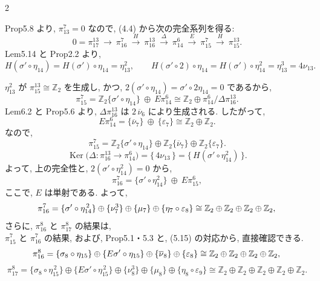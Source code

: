 \documentclass[10pt, leqno]{ltjsarticle}
\newcommand{\ov}[1]{\overline{#1}}
\newcommand{\gen}[1]{\{#1\}}       %
\newcommand{\Ker}{\operatorname{Ker}}
\newcommand{\pit}[2]{\pi_{#1}^{#2}}
\numberwithin{equation}{section}
\theoremstyle{plain}
\theoremstyle{definition}
\theoremstyle{remark}
\begin{document}
\begin{paracol}{2}

Prop5.8 より, \(\pit{13}{7}=0\) なので,  (4.4) から次の完全系列を得る:
\[
0=\pit{17}{13}\ \xrightarrow{}\ \pit{16}{7}\ \xrightarrow{\ H\ }\ \pit{16}{13}
\ \xrightarrow{\ \Delta\ }\ \pit{14}{6}\ \xrightarrow{\ E\ }\ \pit{15}{7}
\ \xrightarrow{\ H\ }\ \pit{15}{13}.
\]
Lem5.14 と Prop2.2 より,
\[
H(\sigma'\circ \eta_{14})=H(\sigma')\circ \eta_{14}=\eta_{13}^{2},
\qquad
H(\sigma'\circ 2)\circ \eta_{14}=H(\sigma')\circ \eta_{14}^{2}=\eta_{13}^{3}=4\nu_{13}.
\]


\noindent
\(\eta_{13}^{2}\) が \(\pit{15}{13}\cong\mathbb Z_{2}\) を生成し, かつ,
\(2(\sigma'\circ\eta_{14})=\sigma'\circ 2\eta_{14}=0\) であるから, 
\[
\pit{15}{7}
=\mathbb{Z}_2\gen{\sigma'\circ\eta_{14}}\ \oplus\ E\pit{14}{6}
\cong \mathbb{Z}_2\oplus\pit{14}{6}/\Delta\pit{16}{13}.
\]
Lem6.2 と Prop5.6 より, 
\(\Delta\pit{16}{13}\) は \(2\,\ov{\nu}_{6}\) により生成される. 
したがって,
\[
E\pit{14}{6}=\gen{\ov{\nu}_{7}}\ \oplus\ \gen{\varepsilon_{7}}\cong \mathbb Z_{2}\oplus\mathbb Z_{2}.
\]
なので, 
\[
\pit{15}{7} = \mathbb{Z}_2\gen{\sigma'\circ\eta_{14}}
\oplus \mathbb{Z}_2\gen{\ov{\nu}_7}
\oplus \mathbb{Z}_2\gen{\varepsilon_7} .
\]
\[
\Ker\bigl(\Delta:\pit{16}{13}\to\pit{14}{6}\bigr)=\gen{\,4\nu_{13}\,}
=\gen{\,H(\sigma'\circ\eta_{14}^2)\,}.
\]
よって, 上の完全性と, \(2(\sigma'\circ\eta_{14}^{2})=0\) から,
\[
\pit{16}{7}
=\gen{\sigma'\circ\eta_{14}^{2}}\ \oplus\ E\pit{15}{6},
\]
ここで, \(E\) は単射である. よって,
\[
\pit{16}{7}=\gen{\sigma'\circ\eta_{14}^{\,2}}\oplus\gen{\nu_{7}^{3}}\oplus\gen{\mu_{7}}\oplus\gen{\eta_{7}\circ\varepsilon_{8}}
\cong\mathbb Z_{2}\oplus\mathbb Z_{2}\oplus\mathbb Z_{2}\oplus\mathbb Z_{2},\\
\]
さらに, \(\pit{16}{8}\) と \(\pit{17}{8}\) の結果は, \\
\(\pit{15}{7}\) と \(\pit{16}{7}\) の結果, および, Prop5.1・5.3 と,
(5.15) の対応から, 直接確認できる. 
\[
\pit{16}{8}=
\gen{\sigma_{8}\circ\eta_{15}}\oplus\gen{E\sigma'\circ\eta_{15}}\oplus
\gen{\ov{\nu}_{8}}\oplus\gen{\varepsilon_{8}}\cong 
\mathbb Z_{2}\oplus\mathbb Z_{2}\oplus\mathbb Z_{2}\oplus\mathbb Z_{2},\\
\]
\[
\pit{17}{8}=
\gen{\sigma_{8}\circ\eta_{15}^{\,2}}\oplus\gen{E\sigma'\circ\eta_{15}^{\,2}}\oplus
\gen{\nu_{8}^{3}}\oplus\gen{\mu_{8}}\oplus\gen{\eta_{8}\circ\varepsilon_{9}}
\cong\mathbb Z_{2}\oplus\mathbb Z_{2}\oplus\mathbb Z_{2}\oplus
\mathbb Z_{2}\oplus\mathbb Z_{2}.
\]


\end{paracol}
\end{document}
